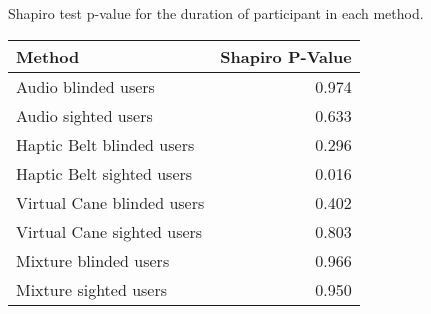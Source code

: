 
\centering
\caption{Shapiro test p-value for the duration of participant in each method.}
\label{tab:shapiro_duration}
\begin{tabular}{lr}
\toprule
                    Method &  Shapiro P-Value \\
\midrule
       Audio blinded users &            0.974 \\
       Audio sighted users &            0.633 \\
 Haptic Belt blinded users &            0.296 \\
 Haptic Belt sighted users &            0.016 \\
Virtual Cane blinded users &            0.402 \\
Virtual Cane sighted users &            0.803 \\
     Mixture blinded users &            0.966 \\
     Mixture sighted users &            0.950 \\
\bottomrule
\end{tabular}
